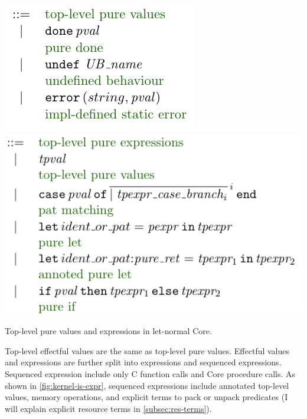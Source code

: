 \begin{marginfigure}
    \includegraphics{figures/kernel-tpval}
    \includegraphics{figures/kernel-tpexpr}
    \caption{Top-level pure values and expressions in let-normal Core.}\label{fig:kernel-tp}
\end{marginfigure}

Top-level effectful values are the same as top-level pure values.
Effectful values and expressions are further split into 
expressions and  sequenced expressions. Sequenced
expression include only C function calls and Core procedure calls.
As shown in \cref{fig:kernel-is-expr},  sequenced
expressions include annotated top-level values, memory operations, and explicit
terms to pack or unpack predicates (I will explain explicit resource terms in
\cref{subsec:res-terms}).

